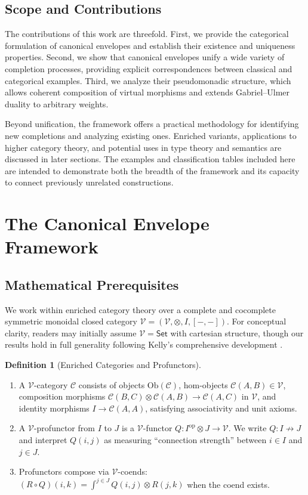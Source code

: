 \documentclass[11pt]{article}
\theoremstyle{plain}
\theoremstyle{definition}
\newtheorem{definition}[theorem]{Definition}
\theoremstyle{remark}
\newcommand{\V}{\mathcal{V}}
\newcommand{\C}{\mathcal{C}}
\newcommand{\cat}[1]{\mathsf{#1}}
\newcommand{\op}{\mathrm{op}}
\newcommand{\tensor}{\otimes}
\begin{document}
\subsection{Scope and Contributions}

The contributions of this work are threefold.  
First, we provide the categorical formulation of canonical envelopes and establish their existence and uniqueness properties.  
Second, we show that canonical envelopes unify a wide variety of completion processes, providing explicit correspondences between classical and categorical examples.  
Third, we analyze their pseudomonadic structure, which allows coherent composition of virtual morphisms and extends Gabriel--Ulmer duality to arbitrary weights.

Beyond unification, the framework offers a practical methodology for identifying new completions and analyzing existing ones. Enriched variants, applications to higher category theory, and potential uses in type theory and semantics are discussed in later sections. The examples and classification tables included here are intended to demonstrate both the breadth of the framework and its capacity to connect previously unrelated constructions.


\section{The Canonical Envelope Framework}

\subsection{Mathematical Prerequisites}

We work within enriched category theory over a complete and cocomplete symmetric monoidal closed category $\V = (\V, \tensor, I, [-,-])$. For conceptual clarity, readers may initially assume $\V = \cat{Set}$ with cartesian structure, though our results hold in full generality following Kelly's comprehensive development \cite{kelly1982basic}.

\begin{definition}[Enriched Categories and Profunctors]
\begin{enumerate}
\item A $\V$-category $\C$ consists of objects $\mathrm{Ob}(\C)$, hom-objects $\C(A,B) \in \V$, composition morphisms $\C(B,C) \tensor \C(A,B) \to \C(A,C)$ in $\V$, and identity morphisms $I \to \C(A,A)$, satisfying associativity and unit axioms.

\item A $\V$-profunctor from $I$ to $J$ is a $\V$-functor $Q : I^{\op} \tensor J \to \V$. We write $Q : I \not\to J$ and interpret $Q(i,j)$ as measuring ``connection strength'' between $i \in I$ and $j \in J$.

\item Profunctors compose via $\V$-coends: $(R \circ Q)(i,k) = \int^{j \in J} Q(i,j) \tensor R(j,k)$ when the coend exists.
\end{enumerate}
\end{definition}
\end{document}
